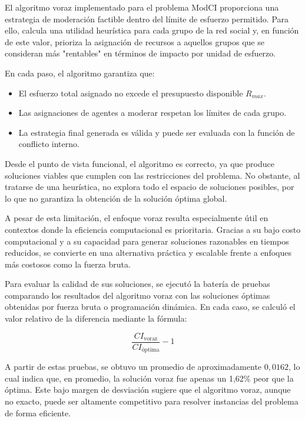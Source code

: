 \documentclass[11pt,letter]{article}
\begin{document}
El algoritmo voraz implementado para el problema ModCI proporciona una estrategia de moderación factible dentro del límite de esfuerzo permitido. Para ello, calcula una utilidad heurística para cada grupo de la red social y, en función de este valor, prioriza la asignación de recursos a aquellos grupos que se consideran más "rentables" en términos de impacto por unidad de esfuerzo.

En cada paso, el algoritmo garantiza que:
\begin{itemize}
    \item El esfuerzo total asignado no excede el presupuesto disponible $R_{max}$.
    \item Las asignaciones de agentes a moderar respetan los límites de cada grupo.
    \item La estrategia final generada es válida y puede ser evaluada con la función de conflicto interno.
\end{itemize}

Desde el punto de vista funcional, el algoritmo es correcto, ya que produce soluciones viables que cumplen con las restricciones del problema. No obstante, al tratarse de una heurística, no explora todo el espacio de soluciones posibles, por lo que no garantiza la obtención de la solución óptima global.

A pesar de esta limitación, el enfoque voraz resulta especialmente útil en contextos donde la eficiencia computacional es prioritaria. Gracias a su bajo costo computacional y a su capacidad para generar soluciones razonables en tiempos reducidos, se convierte en una alternativa práctica y escalable frente a enfoques más costosos como la fuerza bruta.

Para evaluar la calidad de sus soluciones, se ejecutó la batería de pruebas comparando los resultados del algoritmo voraz con las soluciones óptimas obtenidas por fuerza bruta o programación dinámica. En cada caso, se calculó el valor relativo de la diferencia mediante la fórmula:

\[
\frac{CI_{\text{voraz}}}{CI_{\text{óptima}}} - 1
\]
\vspace{0.5cm}

A partir de estas pruebas, se obtuvo un promedio de aproximadamente $0{,}0162$, lo cual indica que, en promedio, la solución voraz fue apenas un 1,62\% peor que la óptima. Este bajo margen de desviación sugiere que el algoritmo voraz, aunque no exacto, puede ser altamente competitivo para resolver instancias del problema de forma eficiente.
\end{document}
